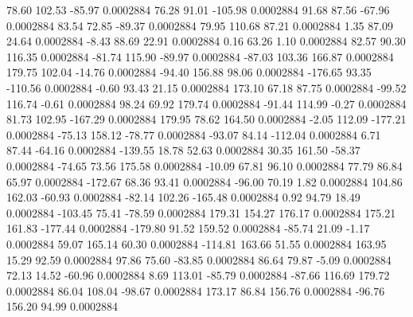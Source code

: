        78.60      102.53      -85.97     0.0002884
       76.28       91.01     -105.98     0.0002884
       91.68       87.56      -67.96     0.0002884
       83.54       72.85      -89.37     0.0002884
       79.95      110.68       87.21     0.0002884
        1.35       87.09       24.64     0.0002884
       -8.43       88.69       22.91     0.0002884
        0.16       63.26        1.10     0.0002884
       82.57       90.30      116.35     0.0002884
      -81.74      115.90      -89.97     0.0002884
      -87.03      103.36      166.87     0.0002884
      179.75      102.04      -14.76     0.0002884
      -94.40      156.88       98.06     0.0002884
     -176.65       93.35     -110.56     0.0002884
       -0.60       93.43       21.15     0.0002884
      173.10       67.18       87.75     0.0002884
      -99.52      116.74       -0.61     0.0002884
       98.24       69.92      179.74     0.0002884
      -91.44      114.99       -0.27     0.0002884
       81.73      102.95     -167.29     0.0002884
      179.95       78.62      164.50     0.0002884
       -2.05      112.09     -177.21     0.0002884
      -75.13      158.12      -78.77     0.0002884
      -93.07       84.14     -112.04     0.0002884
        6.71       87.44      -64.16     0.0002884
     -139.55       18.78       52.63     0.0002884
       30.35      161.50      -58.37     0.0002884
      -74.65       73.56      175.58     0.0002884
      -10.09       67.81       96.10     0.0002884
       77.79       86.84       65.97     0.0002884
     -172.67       68.36       93.41     0.0002884
      -96.00       70.19        1.82     0.0002884
      104.86      162.03      -60.93     0.0002884
      -82.14      102.26     -165.48     0.0002884
        0.92       94.79       18.49     0.0002884
     -103.45       75.41      -78.59     0.0002884
      179.31      154.27      176.17     0.0002884
      175.21      161.83     -177.44     0.0002884
     -179.80       91.52      159.52     0.0002884
      -85.74       21.09       -1.17     0.0002884
       59.07      165.14       60.30     0.0002884
     -114.81      163.66       51.55     0.0002884
      163.95       15.29       92.59     0.0002884
       97.86       75.60      -83.85     0.0002884
       86.64       79.87       -5.09     0.0002884
       72.13       14.52      -60.96     0.0002884
        8.69      113.01      -85.79     0.0002884
      -87.66      116.69      179.72     0.0002884
       86.04      108.04      -98.67     0.0002884
      173.17       86.84      156.76     0.0002884
      -96.76      156.20       94.99     0.0002884
